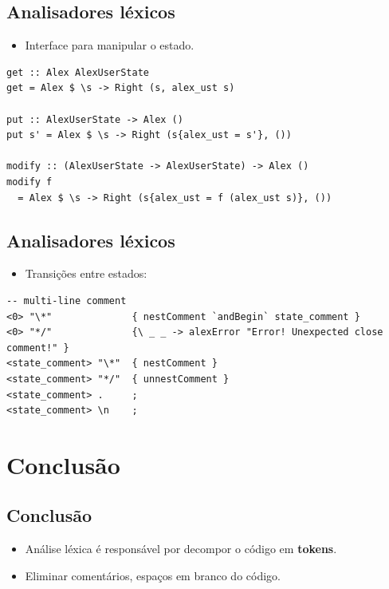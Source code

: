 \documentclass[11pt]{article}
\begin{document}
\subsection*{Analisadores léxicos}
\label{sec:org4aa3356}

\begin{itemize}
\item Interface para manipular o estado.
\end{itemize}

\begin{verbatim}
get :: Alex AlexUserState
get = Alex $ \s -> Right (s, alex_ust s)

put :: AlexUserState -> Alex ()
put s' = Alex $ \s -> Right (s{alex_ust = s'}, ())

modify :: (AlexUserState -> AlexUserState) -> Alex ()
modify f
  = Alex $ \s -> Right (s{alex_ust = f (alex_ust s)}, ())
\end{verbatim}
\subsection*{Analisadores léxicos}
\label{sec:org4a8189f}

\begin{itemize}
\item Transições entre estados:
\end{itemize}

\begin{verbatim}
-- multi-line comment
<0> "\*"              { nestComment `andBegin` state_comment }
<0> "*/"              {\ _ _ -> alexError "Error! Unexpected close comment!" }
<state_comment> "\*"  { nestComment }
<state_comment> "*/"  { unnestComment }
<state_comment> .     ;
<state_comment> \n    ;
\end{verbatim}
\section*{Conclusão}
\label{sec:org3a28047}

\subsection*{Conclusão}
\label{sec:orgaf90fbd}

\begin{itemize}
\item Análise léxica é responsável por decompor o código em \textbf{\textbf{tokens}}.
\item Eliminar comentários, espaços em branco do código.
\end{itemize}
\end{document}

